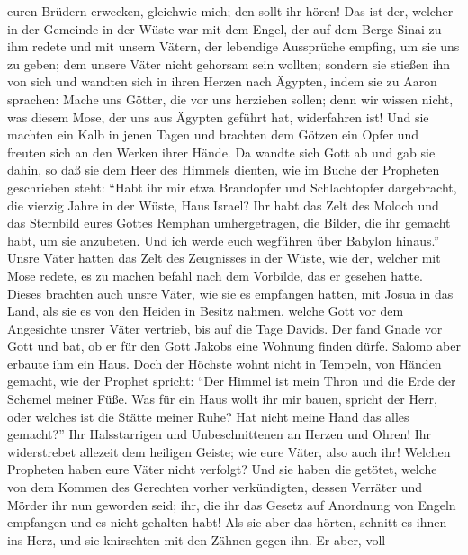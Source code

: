euren Brüdern erwecken, gleichwie mich; den sollt ihr hören!
 Das ist der, welcher in der Gemeinde in der Wüste war
mit dem Engel, der auf dem Berge Sinai zu ihm redete und mit unsern
Vätern, der lebendige Aussprüche empfing, um sie uns zu geben;
 dem unsere Väter nicht gehorsam sein wollten; sondern
sie stießen ihn von sich und wandten sich in ihren Herzen nach Ägypten,
 indem sie zu Aaron sprachen: Mache uns Götter, die vor
uns herziehen sollen; denn wir wissen nicht, was diesem Mose, der uns
aus Ägypten geführt hat, widerfahren ist!  Und sie
machten ein Kalb in jenen Tagen und brachten dem Götzen ein Opfer und
freuten sich an den Werken ihrer Hände.  Da wandte sich
Gott ab und gab sie dahin, so daß sie dem Heer des Himmels dienten, wie
im Buche der Propheten geschrieben steht: ``Habt ihr mir etwa Brandopfer
und Schlachtopfer dargebracht, die vierzig Jahre in der Wüste, Haus
Israel?  Ihr habt das Zelt des Moloch und das Sternbild
eures Gottes Remphan umhergetragen, die Bilder, die ihr gemacht habt, um
sie anzubeten. Und ich werde euch wegführen über Babylon hinaus.''
 Unsre Väter hatten das Zelt des Zeugnisses in der Wüste,
wie der, welcher mit Mose redete, es zu machen befahl nach dem Vorbilde,
das er gesehen hatte.  Dieses brachten auch unsre Väter,
wie sie es empfangen hatten, mit Josua in das Land, als sie es von den
Heiden in Besitz nahmen, welche Gott vor dem Angesichte unsrer Väter
vertrieb, bis auf die Tage Davids.  Der fand Gnade vor
Gott und bat, ob er für den Gott Jakobs eine Wohnung finden dürfe.
 Salomo aber erbaute ihm ein Haus.  Doch
der Höchste wohnt nicht in Tempeln, von Händen gemacht, wie der Prophet
spricht:  ``Der Himmel ist mein Thron und die Erde der
Schemel meiner Füße. Was für ein Haus wollt ihr mir bauen, spricht der
Herr, oder welches ist die Stätte meiner Ruhe?  Hat nicht
meine Hand das alles gemacht?''  Ihr Halsstarrigen und
Unbeschnittenen an Herzen und Ohren! Ihr widerstrebet allezeit dem
heiligen Geiste; wie eure Väter, also auch ihr!  Welchen
Propheten haben eure Väter nicht verfolgt? Und sie haben die getötet,
welche von dem Kommen des Gerechten vorher verkündigten, dessen Verräter
und Mörder ihr nun geworden seid;  ihr, die ihr das
Gesetz auf Anordnung von Engeln empfangen und es nicht gehalten habt!
 Als sie aber das hörten, schnitt es ihnen ins Herz, und
sie knirschten mit den Zähnen gegen ihn.  Er aber, voll
